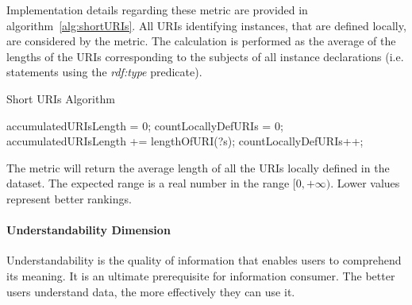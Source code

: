 Implementation details regarding these metric are provided in algorithm~\ref{alg:shortURIs}. All URIs identifying instances, that are defined locally, are considered by the metric. The calculation is performed as the average of the lengths of the URIs corresponding to the subjects of all instance declarations (i.e. statements using the \textit{rdf:type} predicate).
\begin{algorithm}
\caption{Short URIs Algorithm} \label{alg:shortURIs}
\begin{algorithmic}[1]
\State accumulatedURIsLength = 0;
\State countLocallyDefURIs = 0;
\EndProcedure
{}
\State accumulatedURIsLength += lengthOfURI(?s);
\State countLocallyDefURIs++;
\EndIf ~\\
\EndProcedure
\end{algorithmic}
\end{algorithm}
The metric will return the average length of all the URIs locally defined in the dataset. The expected range is a real number in the range $[0, +\infty)$. Lower values represent better rankings.
\paragraph{Understandability Dimension}
Understandability is the quality of information that enables users to comprehend its meaning. 
It is an ultimate prerequisite for information consumer. 
The better users understand data, the more effectively they can use it. 

